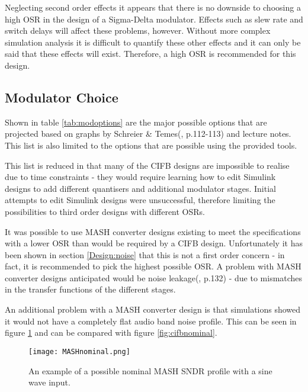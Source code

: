 

Neglecting second order effects it appears that there is no downside to choosing a high OSR in the design of a Sigma-Delta modulator.
Effects such as slew rate and switch delays will affect these problems, however.
Without more complex simulation analysis it is difficult to quantify these other effects and it can only be said that these effects will exist.
Therefore, a high OSR is recommended for this design.

\subsection{Modulator Choice}
Shown in table \ref{tab:modoptions} are the major possible options that are projected based on graphs by Schreier \& Temes(\cite{Schreier2004}, p.112-113) and lecture notes.
This list is also limited to the options that are possible using the provided tools.



This list is reduced in that many of the CIFB designs are impossible to realise due to time constraints - they would require learning how to edit Simulink designs to add different quantisers and additional modulator stages.
Initial attempts to edit Simulink designs were unsuccessful, therefore limiting the possibilities to third order designs with different OSRs.

It was possible to use MASH converter designs existing to meet the specifications with a lower OSR than would be required by a CIFB design.
Unfortunately it has been shown in section \ref{Design:noise} that this is not a first order concern - in fact, it is recommended to pick the highest possible OSR.
A problem with MASH converter designs anticipated would be noise leakage(\cite{Schreier2004}, p.132) - due to mismatches in the transfer functions of the different stages.

An additional problem with a MASH converter design is that simulations showed it would not have a completely flat audio band noise profile.
This can be seen in figure \ref{fig:MASHnominal} and can be compared with figure \ref{fig:cifbnominal}.

\begin{figure}
    \begin{center}
    \texttt{[image: MASHnominal.png]}
    \caption{An example of a possible nominal MASH SNDR profile with a sine wave input.}
    \label{fig:MASHnominal}
    \end{center}
\end{figure}

